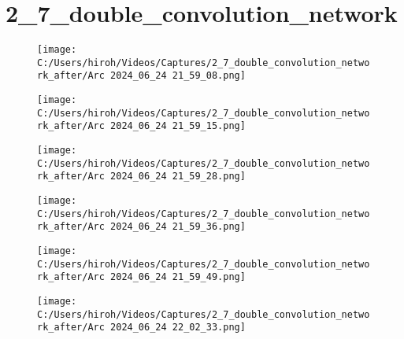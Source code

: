 \documentclass{ltjsarticle}
\begin{document}
\clearpage
\section{2\_7\_double\_convolution\_network}
\begin{figure}[htbp]
  \centering
  \texttt{[image: C:/Users/hiroh/Videos/Captures/2\_7\_double\_convolution\_network\_after/Arc 2024\_06\_24 21\_59\_08.png]}
\end{figure}
\begin{figure}[htbp]
  \centering
  \texttt{[image: C:/Users/hiroh/Videos/Captures/2\_7\_double\_convolution\_network\_after/Arc 2024\_06\_24 21\_59\_15.png]}
\end{figure}
\begin{figure}[htbp]
  \centering
  \texttt{[image: C:/Users/hiroh/Videos/Captures/2\_7\_double\_convolution\_network\_after/Arc 2024\_06\_24 21\_59\_28.png]}
\end{figure}
\begin{figure}[htbp]
  \centering
  \texttt{[image: C:/Users/hiroh/Videos/Captures/2\_7\_double\_convolution\_network\_after/Arc 2024\_06\_24 21\_59\_36.png]}
\end{figure}
\begin{figure}[htbp]
  \centering
  \texttt{[image: C:/Users/hiroh/Videos/Captures/2\_7\_double\_convolution\_network\_after/Arc 2024\_06\_24 21\_59\_49.png]}
\end{figure}
\begin{figure}[htbp]
  \centering
  \texttt{[image: C:/Users/hiroh/Videos/Captures/2\_7\_double\_convolution\_network\_after/Arc 2024\_06\_24 22\_02\_33.png]}
\end{figure}
\end{document}
